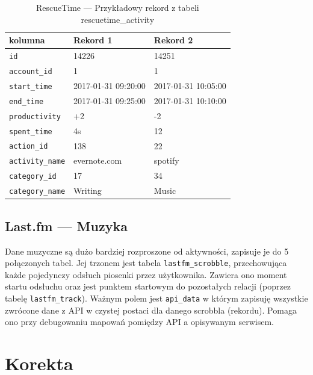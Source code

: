 \documentclass[openright]{xmgr}
\begin{document}
    \begin{table}
    \centering
    \begin{tabular}{|l|l|l|}
        \hline
        kolumna             & Rekord 1             & Rekord 2           \\ \hline
        \verb|id|           & 14226                & 14251              \\
        \verb|account_id|   & 1                    & 1                  \\ \hline
        \verb|start_time|   & 2017-01-31 09:20:00  & 2017-01-31 10:05:00\\
        \verb|end_time|     & 2017-01-31 09:25:00  & 2017-01-31 10:10:00\\ \hline
        \verb|productivity| & +2                   & -2                 \\
        \verb|spent_time|   & 4s                   & 12                 \\ \hline
        \verb|action_id|    & 138                  & 22                 \\
        \verb|activity_name|& evernote.com         & spotify            \\ \hline
        \verb|category_id|  & 17                   & 34                 \\
        \verb|category_name|& Writing              & Music              \\ \hline
    \end{tabular}
        \caption{RescueTime --- Przykładowy rekord z tabeli rescuetime\_activity}
        \label{rescuetime:example-record}
    \end{table}

    \subsection*{Last.fm --- Muzyka}

    Dane muzyczne są dużo bardziej rozproszone od aktywności, zapisuje je do 5 połączonych tabel.
    Jej trzonem jest tabela \verb|lastfm_scrobble|, przechowująca każde pojedynczy odsłuch piosenki przez użytkownika.
    Zawiera ono moment startu odsłuchu oraz jest punktem startowym do pozostałych relacji (poprzez tabelę \verb|lastfm_track|).
    Ważnym polem jest \verb|api_data| w którym zapisuję wszystkie zwrócone dane z API w czystej postaci dla danego scrobbla (rekordu).
    Pomaga ono przy debugowaniu mapowań pomiędzy API a opisywanym serwisem.

    \section{Korekta}
\end{document}
